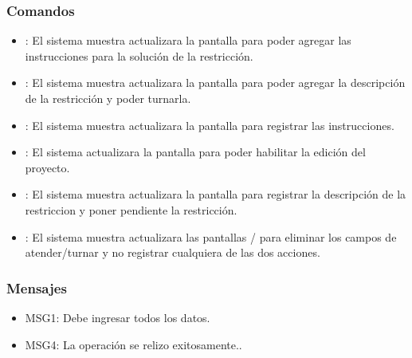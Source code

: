 \subsubsection{Comandos}
\begin{itemize}
 \item {}: El sistema muestra actualizara la pantalla  para poder agregar las instrucciones para la solución de la restricción.
 \item {}: El sistema muestra actualizara la pantalla  para poder agregar la descripción de la restricción y poder turnarla.
 \item {}: El sistema muestra actualizara la pantalla  para registrar las instrucciones.
 \item {}: El sistema actualizara la pantalla  para poder habilitar la edición del proyecto.
 \item {}: El sistema muestra actualizara la pantalla  para registrar la descripción de la restriccion y poner pendiente la restricción.
 \item {}: El sistema muestra actualizara las pantallas  /  para eliminar los campos de atender/turnar y no registrar cualquiera de las dos acciones.
\end{itemize}

\subsubsection{Mensajes}
\begin{itemize}
  \item MSG1: Debe ingresar todos los datos.
  \item MSG4: La operación se relizo exitosamente..
\end{itemize}